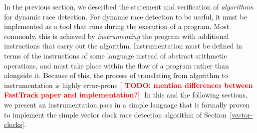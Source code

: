 \documentclass[preprint, 10pt]{sigplanconf}
\newcommand{\TODO}[1]{\textbf{\textcolor{red}{[ TODO: #1]}}}
\begin{document}
In the previous section, we described the statement and verification of \emph{algorithms} for dynamic race detection. For dynamic race detection to be useful, it must be implemented as a tool that runs during the execution of a program. Most commonly, this is achieved by \emph{instrumenting} the program with additional instructions that carry out the algorithm. Instrumentation must be defined in terms of the instructions of some language instead of abstract arithmetic operations, and must take place within the flow of a program rather than alongside it. Because of this, the process of translating from algorithm to instrumentation is highly error-prone \TODO{mention differences between FastTrack paper and implementation?}. In this and the following sections, we present an instrumentation pass in a simple language that is formally proven to implement the simple vector clock race detection algorithm of Section~\ref{vector-clocks}.
\end{document}
